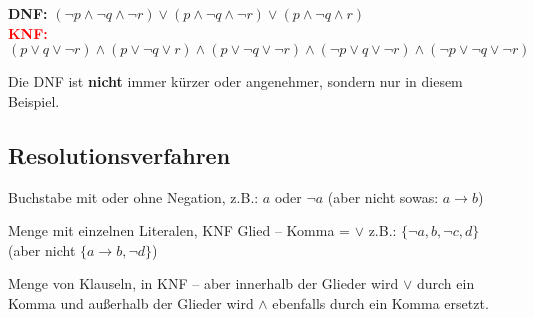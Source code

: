 \documentclass[
    ngerman,
    color=3b,
    summary,
    boxarc,
    main,
    fleqn,
    leqno,
]{rubos-tuda-template}
\begin{document}
    \textcolor{green!80!black}{\textbf{DNF:}} $(\lnot p\land \lnot q\land \lnot r)\lor(p\land \lnot q\land \lnot r)\lor(p\land \lnot q\land r)$\\
    \textcolor{red}{\textbf{KNF:}} $(p\lor q\lor\lnot r)\land(p\lor \lnot q\lor r)\land(p\lor \lnot q\lor \lnot r)\land(\lnot p\lor q\lor \lnot r)\land(\lnot p\lor \lnot q\lor \lnot r)$
    \begin{anmerkung}
        Die DNF ist \textbf{nicht} immer kürzer oder angenehmer, sondern nur in diesem Beispiel.
    \end{anmerkung}
    \clearpage
    \subsection{Resolutionsverfahren}
    \begin{definition}[Literal]
        Buchstabe mit oder ohne Negation, z.B.: $a$ oder $\lnot a$ (aber nicht sowas: $a\rightarrow{}b$)
    \end{definition}
    \begin{definition}[Klausel]
        Menge mit einzelnen Literalen, KNF Glied -- Komma = $\lor$ z.B.: $\{\lnot a, b,\lnot c, d\}$  (aber nicht $\{a\rightarrow{}b,\lnot d\}$)
    \end{definition}
    \begin{definition}[Klauselmenge]
        Menge von Klauseln, in KNF -- aber innerhalb der Glieder wird $\lor$ durch ein Komma und außerhalb der Glieder wird $\land$ ebenfalls durch ein Komma ersetzt.
    \end{definition}
\end{document}
